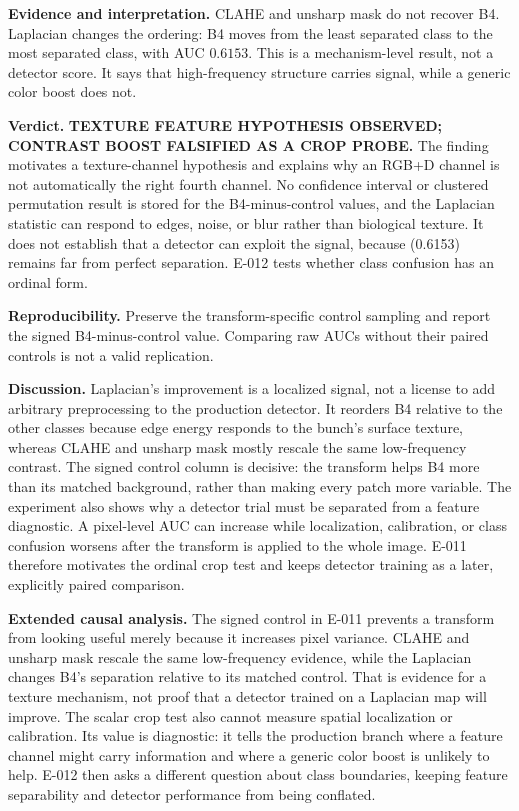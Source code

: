\documentclass[preprint,12pt]{elsarticle}
\begin{document}
\textbf{Evidence and interpretation.} CLAHE and unsharp mask do not recover
B4. Laplacian changes the ordering: B4 moves from the least separated class
to the most separated class, with AUC \(0.6153\). This is a mechanism-level
result, not a detector score. It says that high-frequency structure carries
signal, while a generic color boost does not.

\textbf{Verdict.} \textbf{TEXTURE FEATURE HYPOTHESIS OBSERVED; CONTRAST BOOST
FALSIFIED AS A CROP PROBE.} The finding motivates a texture-channel hypothesis
and explains why an RGB+D channel is not automatically the right fourth
channel. No confidence interval or clustered permutation result is stored for
the B4-minus-control values, and the Laplacian statistic can respond to edges,
noise, or blur rather than biological texture. It does not establish that a
detector can exploit the signal, because (0.6153) remains far from perfect
separation. E-012 tests whether class confusion has an ordinal form.

\textbf{Reproducibility.} Preserve the transform-specific control sampling
and report the signed B4-minus-control value. Comparing raw AUCs without
their paired controls is not a valid replication.

\textbf{Discussion.} Laplacian's improvement is a localized signal, not a
license to add arbitrary preprocessing to the production detector. It
reorders B4 relative to the other classes because edge energy responds to
the bunch's surface texture, whereas CLAHE and unsharp mask mostly rescale
the same low-frequency contrast. The signed control column is decisive:
the transform helps B4 more than its matched background, rather than
making every patch more variable. The experiment also shows why a detector
trial must be separated from a feature diagnostic. A pixel-level AUC can
increase while localization, calibration, or class confusion worsens after
the transform is applied to the whole image. E-011 therefore motivates the
ordinal crop test and keeps detector training as a later, explicitly paired
comparison.

\textbf{Extended causal analysis.} The signed control in E-011 prevents a
transform from looking useful merely because it increases pixel variance.
CLAHE and unsharp mask rescale the same low-frequency evidence, while the
Laplacian changes B4's separation relative to its matched control. That is
evidence for a texture mechanism, not proof that a detector trained on a
Laplacian map will improve. The scalar crop test also cannot measure spatial
localization or calibration. Its value is diagnostic: it tells the production
branch where a feature channel might carry information and where a generic
color boost is unlikely to help. E-012 then asks a different question about
class boundaries, keeping feature separability and detector performance from
being conflated.
\end{document}
